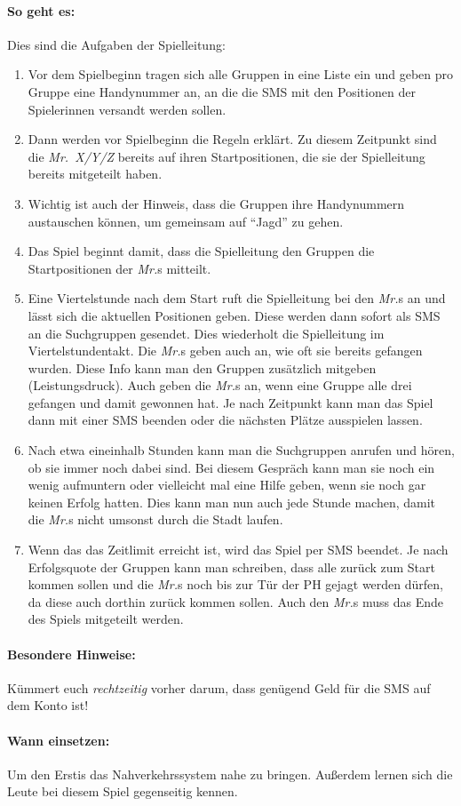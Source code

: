 \paragraph{So geht es:} Dies sind die Aufgaben der Spielleitung:
\begin{enumerate}

\item  Vor dem Spielbeginn tragen sich alle Gruppen in eine Liste ein und geben pro Gruppe eine Handynummer an, an die die SMS
mit den Positionen der Spielerinnen versandt werden sollen.

\item Dann werden vor Spielbeginn die Regeln erklärt. Zu diesem Zeitpunkt sind die \emph{Mr.~X/Y/Z} bereits auf
ihren Startpositionen, die sie der Spielleitung bereits mitgeteilt haben.

\item  Wichtig ist auch der Hinweis, dass die Gruppen ihre Handynummern austauschen können, um gemeinsam auf "`Jagd"' zu gehen.

\item  Das Spiel beginnt damit, dass die Spielleitung den Gruppen die Startpositionen der \emph{Mr.}s mitteilt.

\item  Eine Viertelstunde nach dem Start ruft die Spielleitung bei den \emph{Mr.}s an und lässt sich die aktuellen Positionen
geben. Diese werden dann sofort als SMS an die Suchgruppen gesendet.
Dies wiederholt die Spielleitung im Viertelstundentakt. Die \emph{Mr.}s geben auch an, wie oft sie bereits gefangen wurden. Diese Info
kann man den Gruppen zusätzlich mitgeben (Leistungsdruck). Auch geben die \emph{Mr.}s an, wenn eine Gruppe alle drei
gefangen und damit gewonnen hat. Je nach Zeitpunkt kann man das Spiel dann mit einer SMS beenden oder die nächsten
Plätze ausspielen lassen.

\item  Nach etwa eineinhalb Stunden kann man die Suchgruppen anrufen und hören, ob sie immer noch dabei sind. Bei
diesem Gespräch kann man sie noch ein wenig aufmuntern oder vielleicht mal eine Hilfe geben, wenn sie noch gar keinen
Erfolg hatten. Dies kann man nun auch jede Stunde machen, damit die \emph{Mr.}s nicht umsonst durch die Stadt laufen.

\item  Wenn das das Zeitlimit erreicht ist, wird das Spiel per SMS beendet. Je nach Erfolgsquote der Gruppen kann man schreiben,
dass alle zurück zum Start kommen sollen und die \emph{Mr.}s noch bis zur Tür der PH gejagt werden dürfen, da diese auch
dorthin zurück kommen sollen. Auch den \emph{Mr.}s muss das Ende des Spiels mitgeteilt werden.
\end{enumerate}

\paragraph{Besondere Hinweise:} Kümmert euch \emph{rechtzeitig} vorher darum, dass genügend Geld für die SMS auf dem Konto ist!
\paragraph{Wann einsetzen:} Um den Erstis das Nahverkehrssystem nahe zu bringen. Außerdem lernen sich die Leute bei diesem Spiel gegenseitig kennen.

